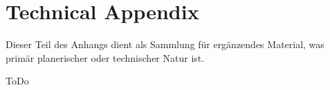 \section{Technical Appendix}
\label{sec:technicalAppendix}

Dieser Teil des Anhangs dient als Sammlung f\"ur erg\"anzendes Material, was prim\"ar planerischer oder technischer Natur ist.


ToDo